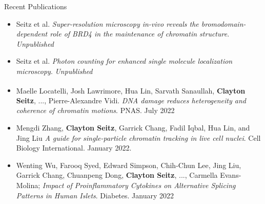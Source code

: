 \documentclass{beamer}					%
\begin{document}
\begin{frame}{Recent Publications}

\begin{itemize}
\item Seitz et al. \textit{Super-resolution microscopy in-vivo reveals the bromodomain-dependent role of BRD4 in the maintenance of chromatin structure}. \textit{Unpublished}

\item Seitz et al. \textit{Photon counting for enhanced single molecule localization microscopy}. \textit{Unpublished}

\item Maelle Locatelli\textsuperscript{\textdagger}, Josh Lawrimore\textsuperscript{\textdagger}, Hua Lin\textsuperscript{\textdagger}, Sarvath Sanaullah, \textbf{Clayton Seitz}, ..., Pierre-Alexandre Vidi. \textit{DNA damage reduces heterogeneity and coherence of chromatin motions}. PNAS. July 2022\\
\vspace{0.1in}
\item Mengdi Zhang, \textbf{Clayton Seitz}, Garrick Chang, Fadil Iqbal, Hua Lin, and Jing Liu \textit{A guide for single-particle chromatin tracking in live cell nuclei}. Cell Biology International. January 2022.\\
\vspace{0.1in}
\item Wenting Wu, Farooq Syed, Edward Simpson, Chih-Chun Lee, Jing Liu, Garrick Chang, Chuanpeng Dong, \textbf{Clayton Seitz}, ..., Carmella Evans-Molina; \textit{Impact of Proinflammatory Cytokines on Alternative Splicing Patterns in Human Islets}. Diabetes. January 2022
\end{itemize}
\end{frame}
\end{document}
